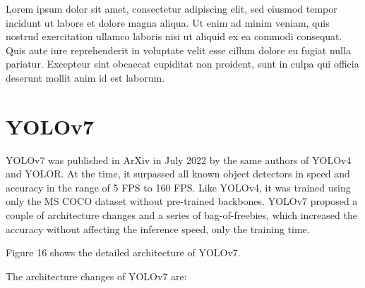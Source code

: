 \documentclass{article}
\begin{document}

Lorem ipsum dolor sit amet, consectetur adipiscing elit, sed eiusmod tempor incidunt ut labore et dolore magna aliqua. Ut enim ad minim veniam, quis nostrud exercitation ullamco laboris nisi ut aliquid ex ea commodi consequat. Quis aute iure reprehenderit in voluptate velit esse cillum dolore eu fugiat nulla pariatur. Excepteur sint obcaecat cupiditat non proident, sunt in culpa qui officia deserunt mollit anim id est laborum.



\section{YOLOv7}



YOLOv7 \cite{wang2023yolov7} was published in ArXiv in July 2022 by the same authors of YOLOv4 and YOLOR. At the time, it surpassed all known object detectors in speed and accuracy in the range of 5 FPS to 160 FPS. Like YOLOv4, it was trained using only the MS COCO dataset without pre-trained backbones. YOLOv7 proposed a couple of architecture changes and a series of bag-of-freebies, which increased the accuracy without affecting the inference speed, only the training time.

Figure 16 shows the detailed architecture of YOLOv7.

The architecture changes of YOLOv7 are:
\end{document}
